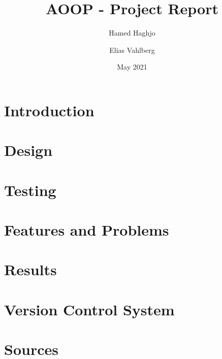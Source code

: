 \documentclass{article}
\title{AOOP - Project Report}
\author{Hamed Haghjo \and Elias Vahlberg}
\date{May 2021}
\begin{document}
\maketitle
\tableofcontents

\newpage
\section{Introduction}


\newpage
\section{Design}


\newpage
\section{Testing}


\newpage
\section{Features and Problems}


\newpage
\section{Results}


\newpage
\section{Version Control System}


\newpage
\section{Sources}

\end{document}
